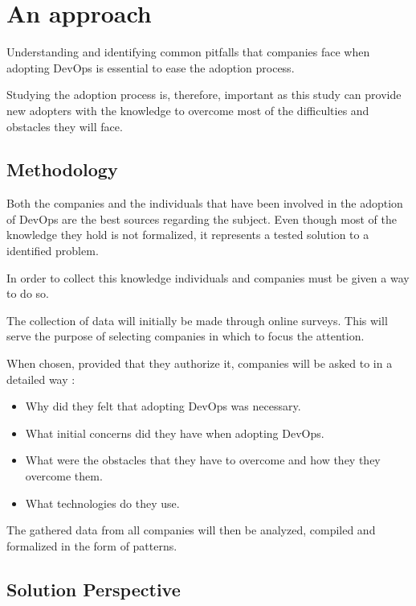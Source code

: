 \chapter{An approach} \label{chap:approach}

        Understanding and identifying common pitfalls that companies face when adopting DevOps is essential to ease the adoption process. 
        
        Studying the adoption process is, therefore, important as this study can provide new adopters with the knowledge to overcome most of the difficulties and obstacles they will face.
        
       
        \section{Methodology}
        
        Both the companies and the individuals that have been involved in the  adoption of DevOps are the best sources regarding the subject. Even though most of the knowledge they hold is not formalized, it represents a tested solution to a identified problem.
        
        In order to collect this knowledge individuals and companies must be given a way to do so. 
        
        The collection of data will initially be made through online surveys. This will serve the purpose of selecting companies in which to focus the attention.
        
        When chosen, provided that they authorize it, companies will be asked to in a detailed way :
        \begin{itemize}
        	\item{ Why did they felt that adopting DevOps was necessary. }
           	\item{ What initial concerns did they have when adopting DevOps. }
			\item{ What were the obstacles that they have to overcome and how they they overcome them. }
            \item{ What technologies do they use. }
		\end{itemize}

        The gathered data from all companies will then be analyzed, compiled and formalized in the form of patterns.
        
        
        \section{Solution Perspective}

